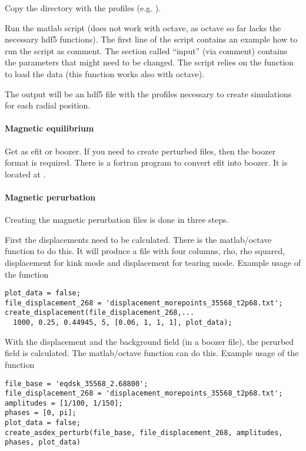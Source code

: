 Copy the directory with the profiles (e.g. ).

Run the matlab script  (does not work with
octave, as octave so far lacks the necessary hdf5 functions).
The first line of the script contains an example how to run the script
as comment.
The section called ``input'' (via comment) contains the parameters that
might need to be changed. The script relies on the function
 to load the data (this function works also with
octave).

The output will be an hdf5 file with the profiles necessary to create
simulations for each radial position.

\paragraph{Magnetic equilibrium}
Get as efit or boozer. If you need to create perturbed files, then the
boozer format is required.
There is a fortran program to convert efit into boozer. It is located at
.

\paragraph{Magnetic perurbation}
Creating the magnetic perurbation files is done in three steps.

First the displacements need to be calculated. There is the
matlab/octave function  to do this. It
will produce a file with four columns, rho, rho squared, displacement
for kink mode and displacement for tearing mode. Example usage of the
function
\begin{verbatim}
plot_data = false;
file_displacement_268 = 'displacement_morepoints_35568_t2p68.txt';
create_displacement(file_displacement_268,...
  1000, 0.25, 0.44945, 5, [0.06, 1, 1, 1], plot_data);
\end{verbatim}
With the displacement and the background field (in a boozer file), the
perurbed field is calculated. The matlab/octave function
 can do this. Example usage of the
function
\begin{verbatim}
file_base = 'eqdsk_35568_2.68800';
file_displacement_268 = 'displacement_morepoints_35568_t2p68.txt';
amplitudes = [1/100, 1/150];
phases = [0, pi];
plot_data = false;
create_asdex_perturb(file_base, file_displacement_268, amplitudes, phases, plot_data)
\end{verbatim}

